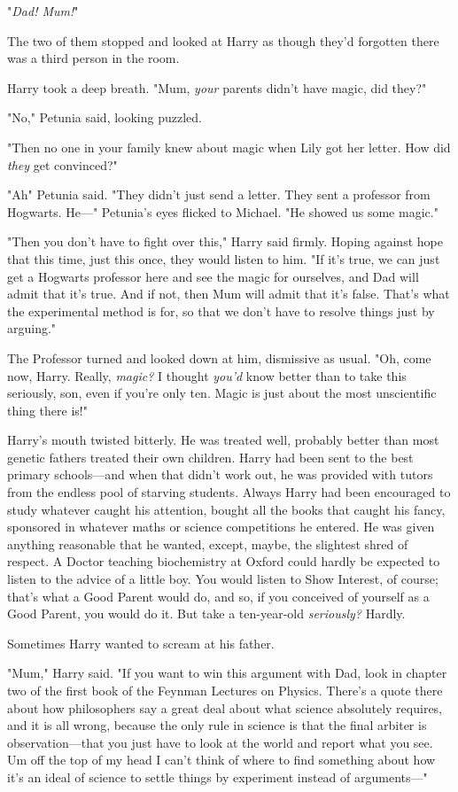 "\emph{Dad! Mum!}"

The two of them stopped and looked at Harry as though they'd forgotten there
was a third person in the room.

Harry took a deep breath. "Mum, \emph{your} parents didn't have magic, did
they?"

"No," Petunia said, looking puzzled.

"Then no one in your family knew about magic when Lily got her letter. How did
\emph{they} get convinced?"

"Ah{\el}" Petunia said. "They didn't just send a letter. They sent a
professor from Hogwarts. He\mbox{---}" Petunia's eyes flicked to Michael. "He showed
us some magic."

"Then you don't have to fight over this," Harry said firmly. Hoping against
hope that this time, just this once, they would listen to him. "If it's true,
we can just get a Hogwarts professor here and see the magic for ourselves, and
Dad will admit that it's true. And if not, then Mum will admit that it's false.
That's what the experimental method is for, so that we don't have to resolve
things just by arguing."

The Professor turned and looked down at him, dismissive as usual. "Oh, come
now, Harry. Really, \emph{magic?} I thought \emph{you'd} know better than to
take this seriously, son, even if you're only ten. Magic is just about the most
unscientific thing there is!"

Harry's mouth twisted bitterly. He was treated well, probably better than most
genetic fathers treated their own children. Harry had been sent to the best
primary schools---and when that didn't work out, he was provided with tutors
from the endless pool of starving students. Always Harry had been encouraged to
study whatever caught his attention, bought all the books that caught his
fancy, sponsored in whatever maths or science competitions he entered. He was
given anything reasonable that he wanted, except, maybe, the slightest shred of
respect. A Doctor teaching biochemistry at Oxford could hardly be expected to
listen to the advice of a little boy. You would listen to Show Interest, of
course; that's what a Good Parent would do, and so, if you conceived of
yourself as a Good Parent, you would do it. But take a ten-year-old
\emph{seriously?} Hardly.

Sometimes Harry wanted to scream at his father.

"Mum," Harry said. "If you want to win this argument with Dad, look in chapter
two of the first book of the Feynman Lectures on Physics. There's a quote there
about how philosophers say a great deal about what science absolutely requires,
and it is all wrong, because the only rule in science is that the final arbiter
is observation---that you just have to look at the world and report what you
see. Um{\el} off the top of my head I can't think of where to find something
about how it's an ideal of science to settle things by experiment instead of
arguments\mbox{---}"

